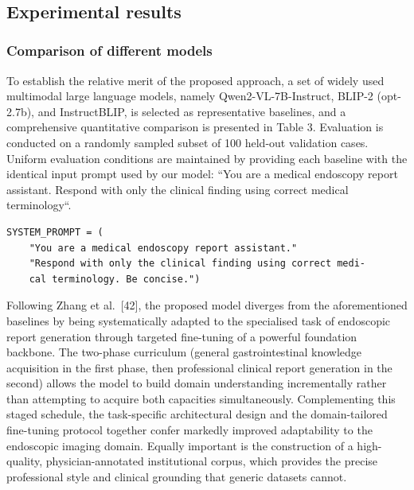 ﻿﻿\documentclass[12pt]{report}
\begin{document}
\subsection{Experimental results}
\subsubsection{Comparison of different models}
To establish the relative merit of the proposed approach, a set of widely used multimodal large language models, namely Qwen2-VL-7B-Instruct, BLIP-2 (opt-2.7b), and InstructBLIP, is selected as representative baselines, and a comprehensive quantitative comparison is presented in Table 3. Evaluation is conducted on a randomly sampled subset of 100 held-out validation cases. Uniform evaluation conditions are maintained by providing each baseline with the identical input prompt used by our model: ``You are a medical endoscopy report assistant. Respond with only the clinical finding using correct medical terminology``. 

\begin{verbatim}
SYSTEM_PROMPT = (
    "You are a medical endoscopy report assistant."
    "Respond with only the clinical finding using correct medi-
    cal terminology. Be concise.")
\end{verbatim}

Following Zhang et al.\ [42], the proposed model diverges from the aforementioned baselines by being systematically adapted to the specialised task of endoscopic report generation through targeted fine-tuning of a powerful foundation backbone. The two-phase curriculum (general gastrointestinal knowledge acquisition in the first phase, then professional clinical report generation in the second) allows the model to build domain understanding incrementally rather than attempting to acquire both capacities simultaneously. Complementing this staged schedule, the task-specific architectural design and the domain-tailored fine-tuning protocol together confer markedly improved adaptability to the endoscopic imaging domain. Equally important is the construction of a high-quality, physician-annotated institutional corpus, which provides the precise professional style and clinical grounding that generic datasets cannot.
\end{document}
